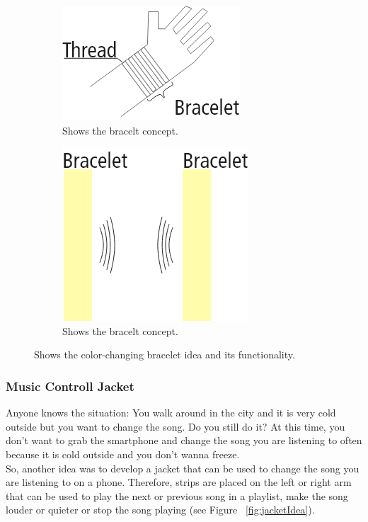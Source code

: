 \documentclass[04_projectProcess.tex]{subfiles}
\begin{document}
    \begin{figure}[H]
        \centering
        \begin{subfigure}{.45\textwidth}
            \centering
            \includegraphics[scale=0.6]{images/projectideas/bracelt_1.png}
            \caption{Shows the bracelt concept.}
            \label{fig:braceltIdea}
            \vspace{6mm}
        \end{subfigure}
        \medskip
        \hspace{1mm}
        \begin{subfigure}{.45\textwidth}
            \centering
            \includegraphics[scale=0.4]{images/projectideas/bracelt_2.png}
            \caption{Shows the bracelt concept.}
            \label{fig:braceltIdea}
            \vspace{6mm}
        \end{subfigure}
        \caption{Shows the color-changing bracelet idea and its functionality.}
        \label{fig:drillingProcess}
    \end{figure}

    \subsubsection{Music Controll Jacket}
    \begin{flushleft}
        Anyone knows the situation: You walk around in the city and it is very cold outside but you want 
        to change the song. Do you still do it? At this time, you don't want to grab the smartphone and 
        change the song you are listening to often because it is cold outside and you don't wanna freeze. \\
        So, another idea was to develop a jacket that can be used to change the song you are listening to 
        on a phone. Therefore, strips are placed on the left or right arm that can be used to play the 
        next or previous song in a playlist, make the song louder or quieter or stop the song playing 
        (see Figure ~\ref{fig:jacketIdea}).
    \end{flushleft}
\end{document}
